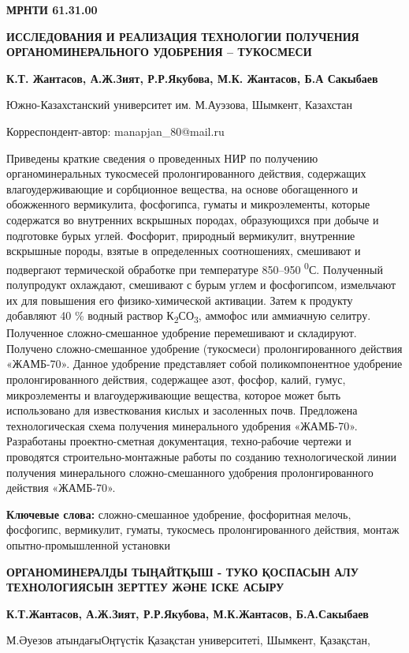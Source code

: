 \newpage
{\bfseries МРНТИ 61.31.00}

{\bfseries ИССЛЕДОВАНИЯ И РЕАЛИЗАЦИЯ ТЕХНОЛОГИИ ПОЛУЧЕНИЯ
ОРГАНОМИНЕРАЛЬНОГО УДОБРЕНИЯ -- ТУКОСМЕСИ}

{\bfseries К.Т. Жантасов, А.Ж.Зият, Р.Р.Якубова, М.К. Жантасов, Б.А
Сакыбаев}

Южно-Казахстанский университет им. М.Ауэзова, Шымкент, Казахстан

Корреспондент-автор: manapjan\_80@mail.ru

Приведены краткие сведения о проведенных НИР по получению
органоминеральных тукосмесей пролонгированного действия, содержащих
влагоудерживающие и сорбционное вещества, на основе обогащенного и
обожженного вермикулита, фосфогипса, гуматы и микроэлементы, которые
содержатся во внутренних вскрышных породах, образующихся при добыче и
подготовке бурых углей. Фосфорит, природный вермикулит, внутренние
вскрышные породы, взятые в определенных соотношениях, смешивают и
подвергают термической обработке при температуре 850--950
\textsuperscript{0}С. Полученный полупродукт охлаждают, смешивают с
бурым углем и фосфогипсом, измельчают их для повышения его
физико-химической активации. Затем к продукту добавляют 40 \% водный
раствор К\textsubscript{2}СО\textsubscript{3}, аммофос или аммиачную
селитру. Полученное сложно-смешанное удобрение перемешивают и
складируют. Получено сложно-смешанное удобрение (тукосмеси)
пролонгированного действия «ЖАМБ-70». Данное удобрение представляет
собой поликомпонентное удобрение пролонгированного действия, содержащее
азот, фосфор, калий, гумус, микроэлементы и влагоудерживающие вещества,
которое может быть использовано для известкования кислых и засоленных
почв. Предложена технологическая схема получения минерального удобрения
«ЖАМБ-70». Разработаны проектно-сметная документация, техно-рабочие
чертежи и проводятся строительно-монтажные работы по созданию
технологической линии получения минерального сложно-смешанного удобрения
пролонгированного действия «ЖАМБ-70».

{\bfseries Ключевые слова:} сложно-смешанное удобрение, фосфоритная мелочь,
фосфогипс, вермикулит, гуматы, тукосмесь пролонгированного действия,
монтаж опытно-промышленной установки

{\bfseries ОРГАНОМИНЕРАЛДЫ ТЫҢАЙТҚЫШ - ТУКО ҚОСПАСЫН АЛУ ТЕХНОЛОГИЯСЫН
ЗЕРТТЕУ ЖӘНЕ ІСКЕ АСЫРУ}

{\bfseries К.Т.Жантасов, А.Ж.Зият, Р.Р.Якубова, М.К.Жантасов, Б.А.Сакыбаев}

М.Әуезов атындағыОңтүстік Қазақстан университеті, Шымкент, Қазақстан,

